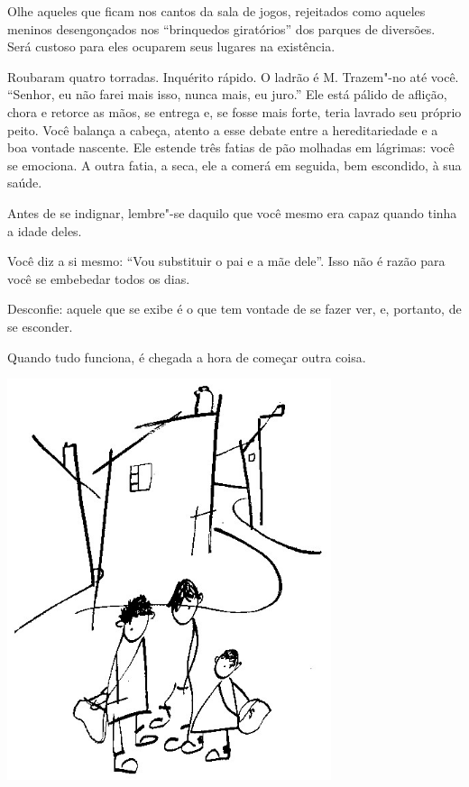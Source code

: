 \bigskip
\bigskip

Olhe aqueles que ficam nos cantos da sala de jogos, rejeitados como
aqueles meninos desengonçados nos ``brinquedos giratórios'' dos parques
de diversões. Será custoso para eles ocuparem seus lugares na
existência.

\bigskip
\bigskip

Roubaram quatro torradas. Inquérito rápido. O ladrão é M. Trazem"-no até
você. ``Senhor, eu não farei mais isso, nunca mais, eu juro.'' Ele está
pálido de aflição, chora e retorce as mãos, se entrega e, se fosse mais
forte, teria lavrado seu próprio peito. Você balança a cabeça, atento a
esse debate entre a hereditariedade e a boa vontade nascente. Ele
estende três fatias de pão molhadas em lágrimas: você se emociona. A
outra fatia, a seca, ele a comerá em seguida, bem escondido, à sua
saúde.

\bigskip
\bigskip

Antes de se indignar, lembre"-se daquilo que você mesmo era capaz quando
tinha a idade deles.

\bigskip
\bigskip

Você diz a si mesmo: ``Vou substituir o pai e a mãe dele''. Isso não é
razão para você se embebedar todos os dias.

\bigskip
\bigskip

Desconfie: aquele que se exibe é o que tem vontade de se fazer ver, e,
portanto, de se esconder.

\bigskip
\bigskip

Quando tudo funciona, é chegada a hora de começar outra coisa.

\pagebreak
\thispagestyle{empty}

\begin{vplace}[.50]
\begin{center}
\includegraphics[width=95mm]{./imgs/Image_7.jpg}
\end{center}
\end{vplace}


